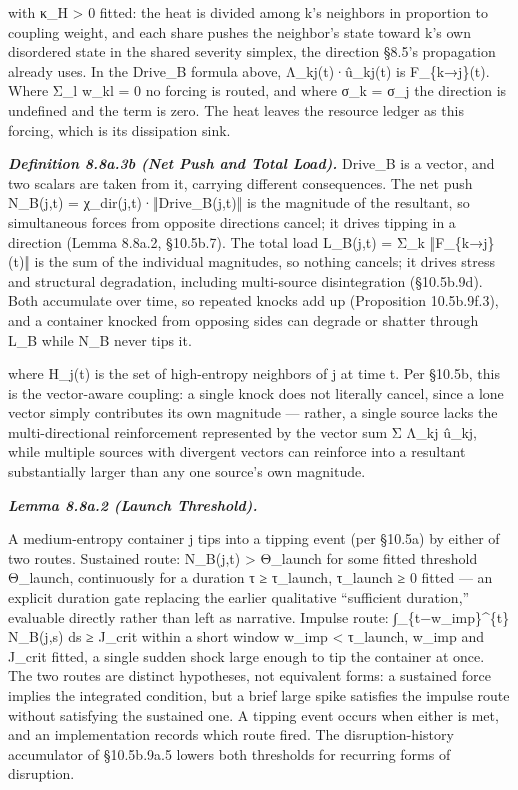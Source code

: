 \documentclass[
]{article}
\begin{document}
with κ\_H \textgreater{} 0 fitted: the heat is divided among k's
neighbors in proportion to coupling weight, and each share pushes the
neighbor's state toward k's own disordered state in the shared severity
simplex, the direction §8.5's propagation already uses. In the Drive\_B
formula above, Λ\_kj(t)·û\_kj(t) is F\_\{k→j\}(t). Where Σ\_l w\_kl = 0
no forcing is routed, and where σ\_k = σ\_j the direction is undefined
and the term is zero. The heat leaves the resource ledger as this
forcing, which is its dissipation sink.

\emph{\textbf{Definition 8.8a.3b (Net Push and Total Load).}} Drive\_B
is a vector, and two scalars are taken from it, carrying different
consequences. The net push N\_B(j,t) = χ\_dir(j,t)·‖Drive\_B(j,t)‖ is
the magnitude of the resultant, so simultaneous forces from opposite
directions cancel; it drives tipping in a direction (Lemma 8.8a.2,
§10.5b.7). The total load L\_B(j,t) = Σ\_k ‖F\_\{k→j\}(t)‖ is the sum of
the individual magnitudes, so nothing cancels; it drives stress and
structural degradation, including multi-source disintegration
(§10.5b.9d). Both accumulate over time, so repeated knocks add up
(Proposition 10.5b.9f.3), and a container knocked from opposing sides
can degrade or shatter through L\_B while N\_B never tips it.

where H\_j(t) is the set of high-entropy neighbors of j at time t. Per
§10.5b, this is the vector-aware coupling: a single knock does not
literally cancel, since a lone vector simply contributes its own
magnitude --- rather, a single source lacks the multi-directional
reinforcement represented by the vector sum Σ Λ\_kj û\_kj, while
multiple sources with divergent vectors can reinforce into a resultant
substantially larger than any one source's own magnitude.

\emph{\textbf{Lemma 8.8a.2 (Launch Threshold).}}

A medium-entropy container j tips into a tipping event (per §10.5a) by
either of two routes. Sustained route: N\_B(j,t) \textgreater{}
Θ\_launch for some fitted threshold Θ\_launch, continuously for a
duration τ ≥ τ\_launch, τ\_launch ≥ 0 fitted --- an explicit duration
gate replacing the earlier qualitative ``sufficient duration,''
evaluable directly rather than left as narrative. Impulse route:
∫\_\{t−w\_imp\}\^{}\{t\} N\_B(j,s) ds ≥ J\_crit within a short window
w\_imp \textless{} τ\_launch, w\_imp and J\_crit fitted, a single sudden
shock large enough to tip the container at once. The two routes are
distinct hypotheses, not equivalent forms: a sustained force implies the
integrated condition, but a brief large spike satisfies the impulse
route without satisfying the sustained one. A tipping event occurs when
either is met, and an implementation records which route fired. The
disruption-history accumulator of §10.5b.9a.5 lowers both thresholds for
recurring forms of disruption.
\end{document}
